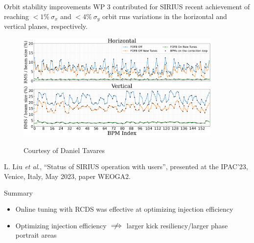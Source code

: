 \documentclass[aspectratio=169]{beamer}
\begin{document}
\begin{frame}{Orbit stability improvements}
WP 3 contributed for SIRIUS recent achievement of reaching $<1\%~\sigma_x$ and $<4\%~\sigma _y$ orbit rms variations in the horizontal and vertical planes, respectively.\\
\vfill
\begin{minipage}{0.7\textwidth}
    \begin{figure}
        \includegraphics[width=0.9\textwidth]{WEOGA2_f5.png}
            \begin{flushleft}
            \tiny Courtesy of Daniel Tavares
        \end{flushleft}
    \end{figure}
\end{minipage}
\hfill
\begin{minipage}{0.29\textwidth}
    \scriptsize
    L. Liu \emph{et al}., “Status of SIRIUS operation with users”,
presented at the IPAC’23, Venice, Italy, May 2023, paper
WEOGA2.
\end{minipage}
\end{frame}
\begin{frame}{Summary}
    \begin{itemize}
    \item Online tuning with RCDS was effective at optimizing injection efficiency
    \item  Optimizing injection efficiency $\centernot\implies$ larger kick resiliency/larger phase portrait areas
\end{itemize}

\end{frame}
\end{document}
